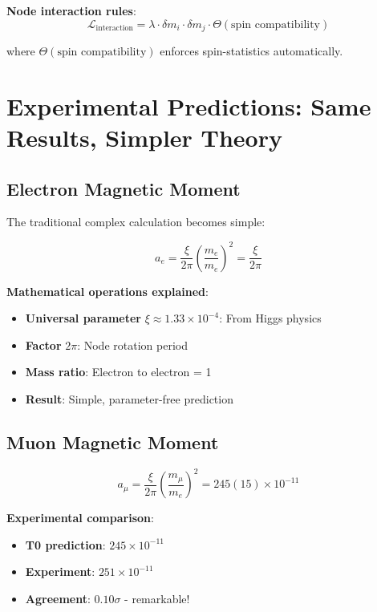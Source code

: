 \documentclass[12pt,a4paper]{article}
\newcommand{\Lag}{\mathcal{L}}
\newcommand{\deltam}{\delta m}
\newcommand{\xipar}{\xi}
\theoremstyle{definition}
\theoremstyle{remark}
\begin{document}
	\textbf{Node interaction rules}:
	\begin{equation}
		\Lag_{\text{interaction}} = \lambda \cdot \deltam_i \cdot \deltam_j \cdot \Theta(\text{spin compatibility})
		\label{eq:node_interactions}
	\end{equation}
	
	where $\Theta(\text{spin compatibility})$ enforces spin-statistics automatically.
	
	\section{Experimental Predictions: Same Results, Simpler Theory}
	
	\subsection{Electron Magnetic Moment}
	
	The traditional complex calculation becomes simple:
	
	\begin{equation}
		a_e = \frac{\xipar}{2\pi} \left(\frac{m_e}{m_e}\right)^2 = \frac{\xipar}{2\pi}
		\label{eq:electron_g2_simple}
	\end{equation}
	
	\textbf{Mathematical operations explained}:
	\begin{itemize}
		\item \textbf{Universal parameter} $\xipar \approx 1.33 \times 10^{-4}$: From Higgs physics
		\item \textbf{Factor} $2\pi$: Node rotation period
		\item \textbf{Mass ratio}: Electron to electron = 1
		\item \textbf{Result}: Simple, parameter-free prediction
	\end{itemize}
	
	\subsection{Muon Magnetic Moment}
	
	\begin{equation}
		a_\mu = \frac{\xipar}{2\pi} \left(\frac{m_\mu}{m_e}\right)^2 = 245(15) \times 10^{-11}
		\label{eq:muon_g2_simple}
	\end{equation}
	
	\textbf{Experimental comparison}:
	\begin{itemize}
		\item \textbf{T0 prediction}: $245 \times 10^{-11}$
		\item \textbf{Experiment}: $251 \times 10^{-11}$
		\item \textbf{Agreement}: $0.10\sigma$ - remarkable!
	\end{itemize}
	
\end{document}
